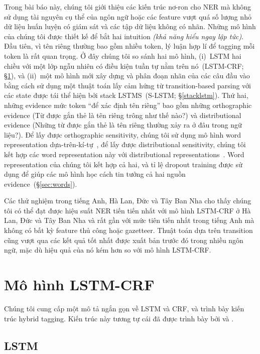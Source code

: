 \documentclass[11pt,letterpaper]{article}
\begin{document}
Trong bài báo này, chúng tôi giới thiệu các kiến trúc nơ-ron cho NER mà không sử dụng tài nguyên cụ thể của ngôn ngữ hoặc các feature vượt quá số lượng nhỏ dữ liệu huấn luyện có giám sát và các tập dữ liệu không có nhãn. 
Những mô hình của chúng tôi được thiết kế để bắt hai intuition \textit{ (khả năng hiểu ngay lập tức)}. 
Đầu tiên, vì tên riêng thường bao gồm nhiều token, lý luận hợp lí để tagging mỗi token là rất quan trọng. 
Ở đây chúng tôi so sánh hai mô hình, (i)~LSTM hai chiều với một lớp ngẫu nhiên có điều kiện tuần tự nằm trên nó~(LSTM-CRF; \S\ref{lstmcrf}), và (ii)~một mô hình mới xây dựng và phân đoạn nhãn của các câu đầu vào bằng cách sử dụng một thuật toán lấy cảm hứng từ transition-based parsing với các state được tái thể hiện bởi stack LSTMS~(S-LSTM; \S\ref{stacklstm}). 
Thứ hai, những evidence mức token ``để xác định tên riêng'' bao gồm những orthographic evidence (Từ được gắn thẻ là tên riêng trông như thế nào?) và distributional evidence (Những từ được gắn thẻ là tên riêng thường xảy ra ở đâu trong ngữ liệu?). 
Để lấy được orthographic sensitivity, chúng tôi sử dụng mô hình word representation dựa-trên-kí-tự~\cite{ling:2015}, để lấy được distributional sensitivity, chúng tôi kết hợp các word representation này với distributional representations~\cite{mikolov2013distributed}.
Word representation của chúng tôi kết hợp cả hai, và tỉ lệ dropout training được sử dụng để giúp các mô hình học cách tin tưởng cả hai nguồn evidence~(\S\ref{sec:words}).

Các thử nghiệm trong tiếng Anh, Hà Lan, Đức và Tây Ban Nha cho thấy chúng tôi có thể đạt được hiệu suất NER tiến tiến nhất với mô hình LSTM-CRF ở Hà Lan, Đức và Tây Ban Nha và rất gần với mức tiên tiến nhất trong tiếng Anh mà không có bất kỳ feature thủ công hoặc gazetteer. 
Thuật toán dựa trên transition cũng vượt qua các kết quả tốt nhất được xuất bản trước đó trong nhiều ngôn ngữ, mặc dù hiệu quả của nó kém hơn so với mô hình LSTM-CRF.

\section{Mô hình LSTM-CRF}
\label{lstmcrf}
Chúng tôi cung cấp một mô tả ngắn gọn về LSTM và CRF, và trình bày kiến trúc hybrid tagging. Kiến trúc này tương tự cái đã được trình bày bởi  và .

\subsection{LSTM}
\label{sec:lstm}
\end{document}

